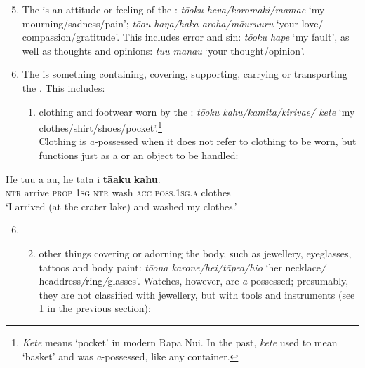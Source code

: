 \begin{enumerate}
\setcounter{enumi}{4} 
\item 
The  is an attitude or feeling of the : \textit{\mbox{tō{\ꞌ}oku} heva/koromaki/ma\-mae} ‘my mourning/sadness/pain’; \textit{\mbox{tō{\ꞌ}ou} haŋa/haka {\ꞌ}aroha/māuruuru} ‘your love/ compassion/gratitude’. This includes error and sin: \textit{tō{\ꞌ}oku hape} ‘my fault’, as well as thoughts and opinions: \textit{tu{\ꞌ}u mana{\ꞌ}u} ‘your thought/opinion’.

\item 
The  is something containing, covering, supporting, carrying or transporting the . This includes:

\begin{enumerate}
\item 
clothing and footwear worn by the : \textit{tō{\ꞌ}oku kahu/kamita/\mbox{kiriva{\ꞌ}e}/ kete} ‘my clothes/shirt/shoes/pocket’.\footnote{\label{fn:300}\textit{Kete} means ‘pocket’ in modern Rapa Nui. In the past, \textit{kete} used to mean ‘basket’ and was \textit{a}{}-possessed, like any container.}\\
Clothing is \textit{a-}possessed when it does not refer to clothing to be worn, but functions just as a  or an object to be handled:

\end{enumerate}
\end{enumerate}

\ea\label{ex:6.84}
\gll He tu{\ꞌ}u a au, he tata i \textbf{tā{\ꞌ}aku} \textbf{kahu}. \\
\textsc{ntr} arrive \textsc{prop} \textsc{1sg} \textsc{ntr} wash \textsc{acc} \textsc{poss.1sg.a} clothes \\

\glt
‘I arrived (at the crater lake) and washed my clothes.’ \textstyleExampleref{[R623.011]} 
\z

\begin{enumerate}
\setcounter{enumi}{5}
\item[]
\begin{enumerate}
\setcounter{enumii}{1}
\item 
other things covering or adorning the body, such as jewellery, eyeglasses, tattoos and body paint: \textit{tō{\ꞌ}ona karone/hei/tāpe{\ꞌ}a/hi{\ꞌ}o} ‘her necklace\textit{/} headdress\textit{/}ring\textit{/}glasses’. Watches, however, are \textit{a}{}-possessed; presumably, they are not classified with jewellery, but with tools and instruments (see 1 in the previous section):

\end{enumerate}
\end{enumerate}

